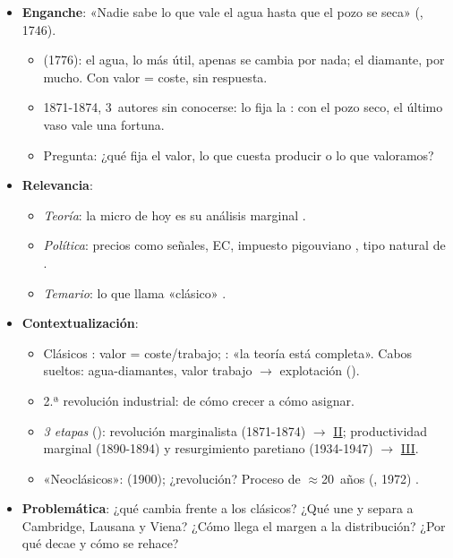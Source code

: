 \documentclass{article}
\begin{document}
\cabecerarepaso
\begin{columnas}

\begin{itemize}
\item \textbf{Enganche}: «Nadie sabe lo que vale el agua hasta que el pozo se seca» (, 1746).
  \begin{itemize}
  \item {} (1776): el agua, lo más útil, apenas se cambia por nada; el diamante, por mucho. Con valor = coste, sin respuesta.
  \item 1871-1874, 3~autores sin conocerse: lo fija la : con el pozo seco, el último vaso vale una fortuna.
  \item Pregunta: ¿qué fija el valor, lo que cuesta producir o lo que valoramos?
  \end{itemize}
\item \textbf{Relevancia}:
  \begin{itemize}
  \item \emph{Teoría}: la micro de hoy es su análisis marginal    .
  \item \emph{Política}: precios como señales, EC, impuesto pigouviano , tipo natural de  .
  \item \emph{Temario}: lo que  llama «clásico» .
  \end{itemize}
\item \textbf{Contextualización}:
  \begin{itemize}
  \item Clásicos : valor = coste/trabajo; : «la teoría está completa». Cabos sueltos: agua-diamantes, valor trabajo $\to$ explotación ().
  \item 2.ª revolución industrial: de cómo crecer a cómo asignar.
  \item \emph{3 etapas} (): revolución marginalista (1871-1874) $\to$ \hyperref[rep:II]{II}; productividad marginal (1890-1894) y resurgimiento paretiano (1934-1947) $\to$ \hyperref[rep:III]{III}.
  \item «Neoclásicos»:  (1900); ¿revolución? Proceso de $\approx$20~años (, 1972) .
  \end{itemize}
\item \textbf{Problemática}: ¿qué cambia frente a los clásicos? ¿Qué une y separa a Cambridge, Lausana y Viena? ¿Cómo llega el margen a la distribución? ¿Por qué decae y cómo se rehace?

\end{itemize}
\end{columnas}
\end{document}
